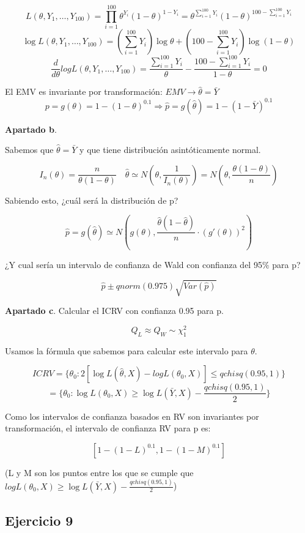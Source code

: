 \[
L(\theta,Y_1,\dots,Y_{100})=\prod_{i=1}^{100} \theta^{Y_i}(1-\theta)^{1-Y_i}=\theta^{\sum_{i=1}^{100} Y_i}(1-\theta)^{100-\sum_{i=1}^{100} Y_i}
\]\[ \log L(\theta,Y_1,\dots,Y_{100})=(\sum_{i=1}^{100}Y_i) \log \theta + (100-\sum_{i=1}^{100}Y_i) \log (1-\theta)
\]\[ \frac{d}{d \theta} log L(\theta,Y_1,\dots,Y_{100})= \frac{\sum_{i=1}^{100}Y_i}{\theta} - \frac{100 - \sum_{i=1}^{100}Y_i}{1-\theta}=0
\]

El EMV es invariante por transformación: $EMV \to \hat{\theta}=\bar{Y}$
\[
    p=g(\theta)=1-(1-\theta)^{0.1}\Longrightarrow \hat{p}=g(\hat{\theta})=1-(1-\bar{Y})^{0.1}
\]

\textbf{Apartado b}.

Sabemos que $\hat{\theta}=\bar{Y}$ y que tiene distribución asintóticamente normal.

\[
I_n(\theta)=\frac{n}{\theta(1-\theta)} \quad \hat{\theta}\simeq N(\theta,\frac{1}{I_n(\theta)}) = N(\theta,\frac{\theta(1-\theta)}{n})
\]

Sabiendo esto, ¿cuál será la distribución de p?

\[
\hat{p}=g(\hat{\theta}) \simeq N(g(\theta),\frac{\hat{\theta}(1-\hat{\theta})}{n}\cdot (g'(\theta))^2)
\]

¿Y cual sería un intervalo de confianza de Wald con confianza del 95$\%$ para p?

\[
\hat{p} \pm qnorm(0.975)\sqrt{Var(\hat{p})}
\]

\textbf{Apartado c}.
Calcular el ICRV con confianza 0.95 para p.

$$Q_L \approx Q_W \sim \chi^2_1$$

Usamos la fórmula que sabemos para calcular este intervalo para $\theta$.

\[
ICRV=\{ \theta_0:2[\log L(\hat{\theta},X) - log L(\theta_0,X)] \leq qchisq(0.95,1)\}
\]\[=\{ \theta_0:\log L(\theta_0,X) \geq \log L(\bar{Y},X)-\frac{qchisq(0.95,1)}{2}\}
\]

Como los intervalos de confianza basados en RV son invariantes por transformación, el intervalo de confianza RV para p es:

\[
[1-(1-L)^{0.1},1-(1-M)^{0.1}]
\]

(L y M son los puntos entre los que se cumple que $log L(\theta_0,X) \geq \log L(\bar{Y},X)-\frac{qchisq(0.95,1)}{2}$)

\subsection*{Ejercicio 9}


